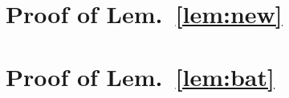 \documentclass[letterpaper,10pt,journal,twoside]{IEEEtran}
\theoremstyle{definition}
\begin{document}
\section{Proof of Lem.~\ref{lem:new}}
\label{app:proof-new}

\section{Proof of Lem.~\ref{lem:bat}}
\label{app:proof-bat}


\end{document}

